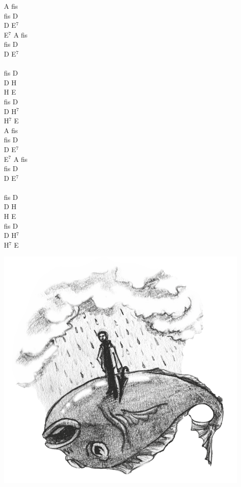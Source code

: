 \documentclass[a5paper, 10pt]{book}
\begin{document}
\begin{minipage}[t]{0.2\textwidth}
  A fis\\
  fis D\\
  D E$^7$\\
  E$^7$ A fis\\
  fis D\\
  D E$^7$\\
  \\
  fis D\\
  D H\\
  H E\\
  fis D\\
  D H$^7$\\
  H$^7$ E\\
  
  A fis\\
  fis D\\
  D E$^7$\\
  E$^7$ A fis\\
  fis D\\
  D E$^7$\\
  \\
  fis D\\
  D H\\
  H E\\
  fis D\\
  D H$^7$\\
  H$^7$ E\\
\end{minipage}
\includegraphics[height=0.4\textwidth,center]{images/ciagle_pada.png}\\

\newpage
\end{document}
